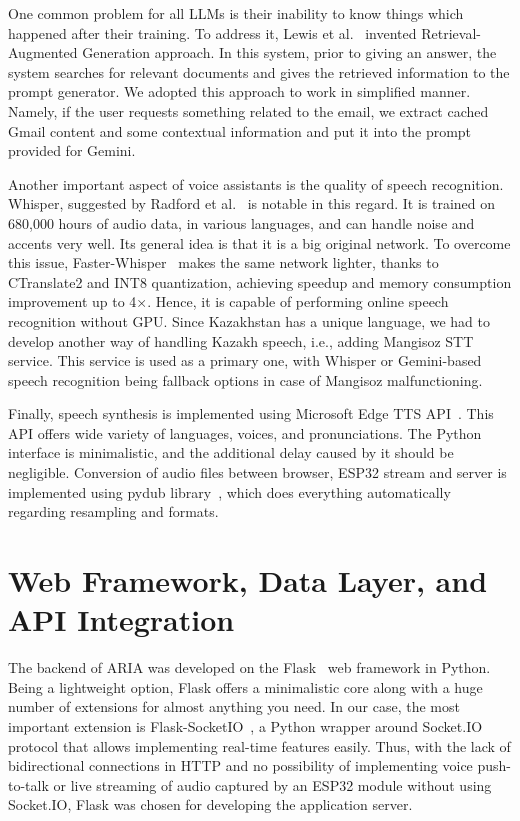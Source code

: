 One common problem for all LLMs is their inability to know things which happened after their training. To address it, Lewis et al.~\cite{rag} invented Retrieval-Augmented Generation approach. In this system, prior to giving an answer, the system searches for relevant documents and gives the retrieved information to the prompt generator. We adopted this approach to work in simplified manner. Namely, if the user requests something related to the email, we extract cached Gmail content and some contextual information and put it into the prompt provided for Gemini.

Another important aspect of voice assistants is the quality of speech recognition. Whisper, suggested by Radford et al.~\cite{whisper} is notable in this regard. It is trained on 680,000 hours of audio data, in various languages, and can handle noise and accents very well. Its general idea is that it is a big original network. To overcome this issue, Faster-Whisper~\cite{faster-whisper} makes the same network lighter, thanks to CTranslate2 and INT8 quantization, achieving speedup and memory consumption improvement up to 4×. Hence, it is capable of performing online speech recognition without GPU. Since Kazakhstan has a unique language, we had to develop another way of handling Kazakh speech, i.e., adding Mangisoz STT service. This service is used as a primary one, with Whisper or Gemini-based speech recognition being fallback options in case of Mangisoz malfunctioning.

Finally, speech synthesis is implemented using Microsoft Edge TTS API~\cite{edge-tts}. This API offers wide variety of languages, voices, and pronunciations. The Python interface is minimalistic, and the additional delay caused by it should be negligible. Conversion of audio files between browser, ESP32 stream and server is implemented using pydub library~\cite{pydub}, which does everything automatically regarding resampling and formats.





\section{Web Framework, Data Layer, and API Integration}


The backend of ARIA was developed on the Flask~\cite{flask} web framework in Python. Being a lightweight option, Flask offers a minimalistic core along with a huge number of extensions for almost anything you need. In our case, the most important extension is Flask-SocketIO~\cite{flask-socketio}, a Python wrapper around Socket.IO~\cite{socketio} protocol that allows implementing real-time features easily. Thus, with the lack of bidirectional connections in HTTP and no possibility of implementing voice push-to-talk or live streaming of audio captured by an ESP32 module without using Socket.IO, Flask was chosen for developing the application server.

